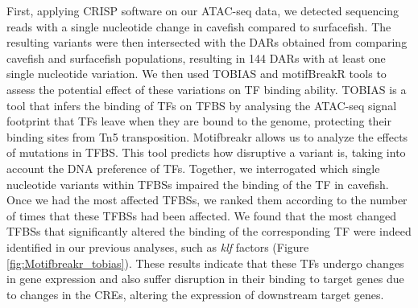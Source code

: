 First, applying CRISP software \parencite{bansal_statistical_2010} on our ATAC-seq data, we detected sequencing reads with a single nucleotide change in cavefish compared to surfacefish. The resulting variants were then intersected with the DARs obtained from comparing cavefish and surfacefish populations, resulting in 144 DARs with at least one single nucleotide variation. We then used TOBIAS and motifBreakR tools \parencite{bentsen_atac-seq_2020, coetzee_motifbreakr_2015} to assess the potential effect of these variations on TF binding ability. TOBIAS is a tool that infers the binding of TFs on TFBS by analysing the ATAC-seq signal footprint that TFs leave when they are bound to the genome, protecting their binding sites from Tn5 transposition. Motifbreakr allows us to analyze the effects of mutations in TFBS. This tool predicts how disruptive a variant is, taking into account the DNA preference of TFs. Together, we interrogated which single nucleotide variants within TFBSs impaired the binding of the TF in cavefish. Once we had the most affected TFBSs, we ranked them according to the number of times that these TFBSs had been affected. We found that the most changed TFBSs that significantly altered the binding of the corresponding TF were indeed identified in our previous analyses, such as \textit{klf} factors (Figure \ref{fig:Motifbreakr_tobias}). These results indicate that these TFs undergo changes in gene expression and also suffer disruption in their binding to target genes due to changes in the CREs, altering the expression of downstream target genes.


